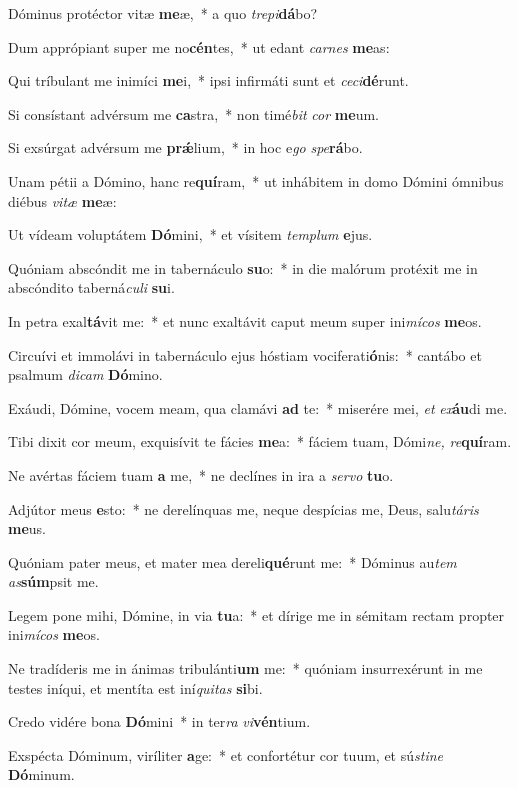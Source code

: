 \item Dóminus protéctor vitæ \textbf{me}æ,~* a quo \textit{trepi}\textbf{dá}bo?
\item Dum apprópiant super me no\textbf{cén}tes,~* ut edant \textit{carnes} \textbf{me}as:
\item Qui tríbulant me inimíci \textbf{me}i,~* ipsi infirmáti sunt et \textit{ceci}\textbf{dé}runt.
\item Si consístant advérsum me \textbf{ca}stra,~* non timé\textit{bit} \textit{cor} \textbf{me}um.
\item Si exsúrgat advérsum me \textbf{prǽ}lium,~* in hoc e\textit{go} \textit{spe}\textbf{rá}bo.
\item Unam pétii a Dómino, hanc re\textbf{quí}ram,~* ut inhábitem in domo Dómini ómnibus diébus \textit{vitæ} \textbf{me}æ:
\item Ut vídeam voluptátem \textbf{Dó}mini,~* et vísitem \textit{templum} \textbf{e}jus.
\item Quóniam abscóndit me in tabernáculo \textbf{su}o:~* in die malórum protéxit me in abscóndito taberná\textit{culi} \textbf{su}i.
\item In petra exal\textbf{tá}vit me:~* et nunc exaltávit caput meum super ini\textit{mícos} \textbf{me}os.
\item Circuívi et immolávi in tabernáculo ejus hóstiam vociferati\textbf{ó}nis:~* cantábo et psalmum \textit{dicam} \textbf{Dó}mino.
\item Exáudi, Dómine, vocem meam, qua clamávi \textbf{ad} te:~* miserére mei, \textit{et} \textit{ex}\textbf{áu}di me.
\item Tibi dixit cor meum, exquisívit te fácies \textbf{me}a:~* fáciem tuam, Dómi\textit{ne,} \textit{re}\textbf{quí}ram.
\item Ne avértas fáciem tuam \textbf{a} me,~* ne declínes in ira a \textit{servo} \textbf{tu}o.
\item Adjútor meus \textbf{e}sto:~* ne derelínquas me, neque despícias me, Deus, salu\hspace{0.03em}\textit{táris} \textbf{me}us.
\item Quóniam pater meus, et mater mea dereli\textbf{qué}runt me:~* Dóminus au\hspace{0.03em}\textit{tem} \textit{as}\textbf{súm}psit me.
\item Legem pone mihi, Dómine, in via \textbf{tu}a:~* et dírige me in sémitam rectam propter ini\textit{mícos} \textbf{me}os.
\item Ne tradíderis me in ánimas tribulánti\textbf{um} me:~* quóniam insurrexérunt in me testes iníqui, et mentíta est iní\hspace{0.03em}\textit{quitas} \textbf{si}bi.
\item Credo vidére bona \textbf{Dó}mini~* in ter\textit{ra} \textit{vi}\textbf{vén}tium.
\item Exspécta Dóminum, viríliter \textbf{a}ge:~* et confortétur cor tuum, et sú\hspace{0.05em}\textit{stine} \textbf{Dó}minum.
